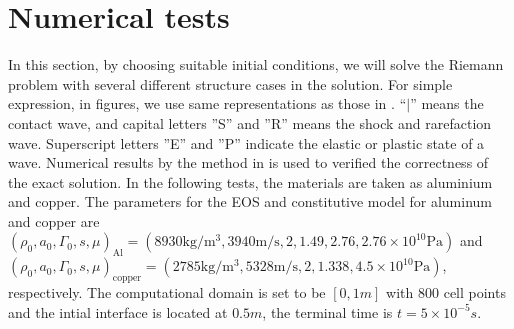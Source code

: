 \documentclass[review]{elsarticle}
\begin{document}
\section{Numerical  tests }
In this section, by choosing suitable initial conditions, we will solve the Riemann problem with several different structure cases in the solution. For simple  expression, in figures, we use same representations as those in \cite{gao2018complete}. ``$|$'' means the contact wave, and capital letters ''S'' and ''R'' means the shock and rarefaction wave. Superscript letters ''E'' and  ''P'' indicate the elastic or plastic state of a wave.  Numerical results by the method  in \cite{liumulti} is used to verified the correctness of the exact solution. In the following tests, the materials are taken as  aluminium and copper. The parameters for the EOS and constitutive model for aluminum and copper  are
$ (\rho_0, a_0, \Gamma_0, s, \mu)_{\text{Al}} =(8930 \text{kg}/\text{m}^3, 3940 \text{m}/\text{s},2, 1.49, 2.76 ,2.76\times 10^{10} \text{Pa} )$ and   $(\rho_0, a_0, \Gamma_0, s, \mu)_{\text{copper}} =(2785 \text{kg}/\text{m}^3, 5328 \text{m}/\text{s},2, 1.338,4.5\times 10^{10}\text{Pa})$, respectively. The computational domain is set to be $[0,1m]$ with 800 cell points and the intial interface is located at $0.5m$, the terminal time is $t=5\times 10^{-5}s$.
\end{document}
